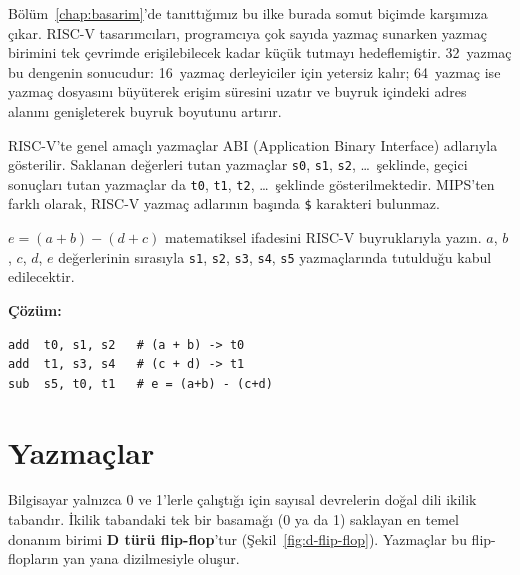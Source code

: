 \begin{tanim}
Bölüm~\ref{chap:basarim}'de tanıttığımız bu ilke burada somut biçimde karşımıza çıkar. RISC-V tasarımcıları, programcıya çok sayıda yazmaç sunarken yazmaç birimini tek çevrimde erişilebilecek kadar küçük tutmayı hedeflemiştir. 32~yazmaç bu dengenin sonucudur: 16~yazmaç derleyiciler için yetersiz kalır; 64~yazmaç ise yazmaç dosyasını büyüterek erişim süresini uzatır ve buyruk içindeki adres alanını genişleterek buyruk boyutunu artırır.
\end{tanim}

RISC-V'te genel amaçlı yazmaçlar ABI (Application Binary Interface) adlarıyla gösterilir. Saklanan değerleri tutan yazmaçlar \texttt{s0}, \texttt{s1}, \texttt{s2}, \ldots\ şeklinde, geçici sonuçları tutan yazmaçlar da \texttt{t0}, \texttt{t1}, \texttt{t2}, \ldots\ şeklinde gösterilmektedir. MIPS'ten farklı olarak, RISC-V yazmaç adlarının başında \texttt{\$} karakteri bulunmaz.

\begin{ornek}[3.2]
$e = (a + b) - (d + c)$ matematiksel ifadesini RISC-V buyruklarıyla yazın. $a$, $b$, $c$, $d$, $e$ değerlerinin sırasıyla \texttt{s1}, \texttt{s2}, \texttt{s3}, \texttt{s4}, \texttt{s5} yazmaçlarında tutulduğu kabul edilecektir.

\textbf{Çözüm:}
\begin{lstlisting}[style=riscv]
add  t0, s1, s2   # (a + b) -> t0
add  t1, s3, s4   # (c + d) -> t1
sub  s5, t0, t1   # e = (a+b) - (c+d)
\end{lstlisting}
\end{ornek}


\section{Yazmaçlar}
\label{sec:yazmaclar}

Bilgisayar yalnızca 0 ve 1'lerle çalıştığı için sayısal devrelerin doğal dili ikilik tabandır. İkilik tabandaki tek bir basamağı (0 ya da 1) saklayan en temel donanım birimi \textbf{D türü flip-flop}'tur (Şekil~\ref{fig:d-flip-flop}). Yazmaçlar bu flip-flopların yan yana dizilmesiyle oluşur.

